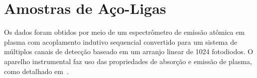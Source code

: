 \section{Amostras de Aço-Ligas}
\label{sec:amoacolig}
Os dados foram obtidos por meio de um espectrômetro de emissão atômica em plasma com acoplamento indutivo sequencial convertido para um sistema de múltiplos canais de detecção baseado em um arranjo linear de 1024 fotodiodos. O aparelho instrumental faz uso das propriedades de absorção e emissão de plasma, como detalhado em~\cite{PIMENTEL:1998}.


